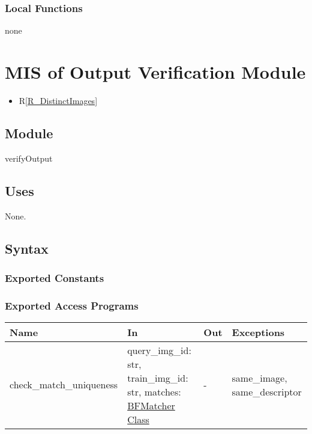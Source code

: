 \documentclass[12pt, titlepage]{article}
\begin{document}
\subsubsection{Local Functions}
none

\section{MIS of Output Verification Module} \label{mOV}
\begin{itemize}
  \item R\ref{R_DistinctImages}
\end{itemize}
\subsection{Module}

verifyOutput

\subsection{Uses}
None.

\subsection{Syntax}

\subsubsection{Exported Constants}

\subsubsection{Exported Access Programs}

\begin{center}
\begin{tabular}{p{4.5cm} p{4cm} p{4cm} p{3cm}}
\hline
\textbf{Name} & \textbf{In} & \textbf{Out} & \textbf{Exceptions} \\
\hline
check\_match\_uniqueness 
& query\_img\_id: str, \newline
train\_img\_id: str, \newline
matches: \href{https://docs.opencv.org/3.4/d3/da1/classcv_1_1BFMatcher.html}{BFMatcher Class}
& -  
& same\_image, \newline
same\_descriptor \\
\hline
\end{tabular}
\end{center}
\end{document}
